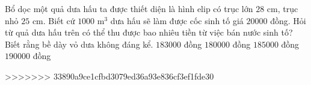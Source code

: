 \begin{ex}%
	Bổ dọc một quả dưa hấu ta được thiết diện là hình elip có trục lớn $28$ cm, trục nhỏ $25$ cm. Biết cứ $1000$ m$^3$ dưa hấu sẽ làm được cốc sinh tố giá $20000$ đồng. Hỏi từ quả dưa hấu trên có thể thu được bao nhiêu tiền từ việc bán nước sinh tố? Biết rằng bề dày vỏ dưa không đáng kể.
	\choice
	{\True $183000$ đồng} 
	{ $180000$ đồng} 
	{ $185000$ đồng} 
	{ $190000$ đồng}
\end{ex} 


>>>>>>> 33890a9ce1cfbd3079ed36a93e836cf3ef1fde30
